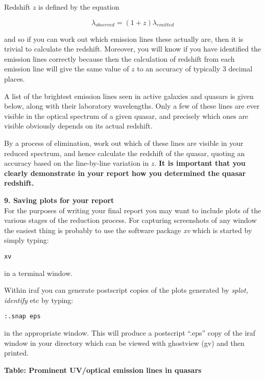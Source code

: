 \bigskip

Redshift $z$ is defined by the equation

$$\lambda_{observed} = (1 + z) \lambda_{emitted}$$

and so if you can work out which emission lines these actually are, then
it is trivial to calculate the redshift. Moreover, you will know if
you have identified the emission lines correctly because then 
the calculation of redshift from each emission line will give the same
value of $z$ to an accuracy of typically 3 decimal places.

A list of the brightest emission lines seen in active galaxies and
quasars is given below, along with their laboratory wavelengths. 
Only a few of these lines are ever visible in the optical spectrum of a given quasar, and
precisely which ones are visible obviously depends on its actual redshift.
 
By a process of elimination, work out which of these lines are visible in
your reduced spectrum, and hence calculate the redshift of the quasar,
quoting an accuracy based on the line-by-line variation in $z$. {\bf It is important that
you clearly demonstrate in your report how you determined the quasar redshift.}

\newpage

{\large {\bf 9. Saving plots for your report}}\\
For the purposes of writing your final report you may want to include
plots of the various stages of the reduction process. For capturing
screenshots of any window the easiest thing is probably to use the
software package {\it xv} which is started by simply typing:

{\tt xv} 

in a terminal window. 


Within {\sc iraf} you can generate
postscript copies of the plots generated by {\it splot, identify} etc
by typing:

{\tt :.snap eps}

in the appropriate window. This will produce a postscript ``.eps''
copy of the {\sc iraf} window in your directory which can be viewed
with ghostview (gv) and then printed.



{\bf Table: Prominent UV/optical emission lines in quasars}

